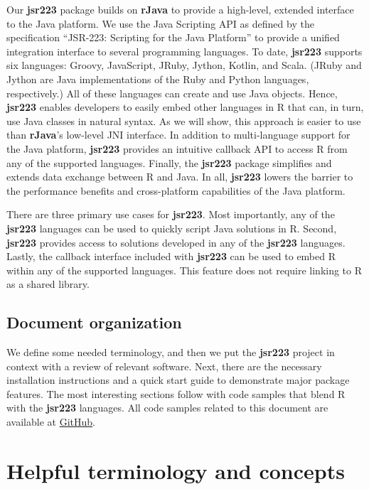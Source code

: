 Our \textbf{jsr223} package builds on \textbf{rJava} to provide a high-level, extended interface to the Java platform. We use the Java Scripting API \citep{jsa} as defined by the specification “JSR-223: Scripting for the Java Platform” \citep{jsr223spec} to provide a unified integration interface to several programming languages. To date, \textbf{jsr223} supports six languages: Groovy, JavaScript, JRuby, Jython, Kotlin, and Scala. (JRuby and Jython are Java implementations of the Ruby and Python languages, respectively.) All of these languages can create and use Java objects. Hence, \textbf{jsr223} enables developers to easily embed other languages in R that can, in turn, use Java classes in natural syntax. As we will show, this approach is easier to use than \textbf{rJava}'s low-level JNI interface. In addition to multi-language support for the Java platform, \textbf{jsr223} provides an intuitive callback API to access R from any of the supported languages. Finally, the \textbf{jsr223} package simplifies and extends data exchange between R and Java. In all, \textbf{jsr223} lowers the barrier to the performance benefits and cross-platform capabilities of the Java platform.

There are three primary use cases for \textbf{jsr223}. Most importantly, any of the \textbf{jsr223} languages can be used to quickly script Java solutions in R. Second, \textbf{jsr223} provides access to solutions developed in any of the \textbf{jsr223} languages. Lastly, the callback interface included with \textbf{jsr223} can be used to embed R within any of the supported languages. This feature does not require linking to R as a shared library.

\subsection{Document organization}

We define some needed terminology, and then we put the \textbf{jsr223} project in context with a review of relevant software. Next, there are the necessary installation instructions and a quick start guide to demonstrate major package features. The most interesting sections follow with code samples that blend R with the \textbf{jsr223} languages. All code samples related to this document are available at \href{http://notavalidaddresss////}{GitHub}.

\section{Helpful terminology and concepts}

